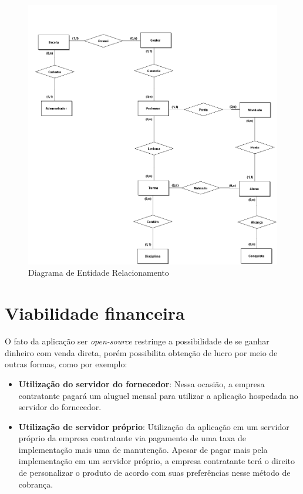 \documentclass[
    12pt,               %
    openright,          %
    oneside,
    a4paper,            %
    paginasA3,  %
    english,            %
    brazil              %
    ]{ifsp-spo-inf-ctds} %
\begin{document}
\begin{figure}[htb]
    \centering
	\includegraphics[width=16cm]{imagens/DER.png}
	\caption{\label{recompensa} Diagrama de Entidade Relacionamento}
\end{figure}
\FloatBarrier


\chapter{Viabilidade financeira}
O fato da aplicação ser \textit{\gls{open-source}} restringe a possibilidade de se ganhar dinheiro com venda direta, porém possibilita obtenção de lucro por meio de outras formas, como por exemplo:

\begin{itemize}
   \item \textbf{Utilização do servidor do fornecedor}: Nessa ocasião, a empresa contratante pagará um aluguel mensal para utilizar a aplicação hospedada no servidor do fornecedor.
   \item \textbf{Utilização de servidor próprio}: Utilização da aplicação em um servidor próprio da empresa contratante via pagamento de uma taxa de implementação mais uma de manutenção. Apesar de pagar mais pela implementação em um servidor próprio, a empresa contratante terá o direito de personalizar o produto de acordo com suas preferências nesse método de cobrança.
\end{itemize}
\end{document}
